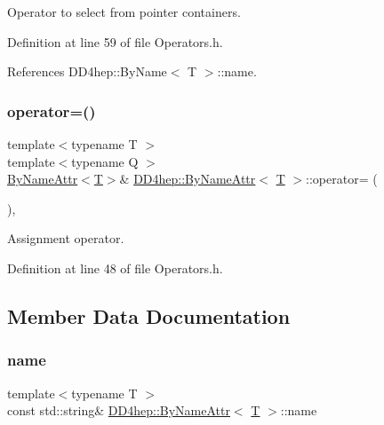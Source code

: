 Operator to select from pointer containers. 



Definition at line 59 of file Operators.\+h.



References D\+D4hep\+::\+By\+Name$<$ T $>$\+::name.

\hypertarget{class_d_d4hep_1_1_by_name_attr_ade17ea4f15656cd891831acb2dc83465}{}\label{class_d_d4hep_1_1_by_name_attr_ade17ea4f15656cd891831acb2dc83465} 
\subsubsection{\texorpdfstring{operator=()}{operator=()}}
{\footnotesize\ttfamily template$<$typename T $>$ \\
template$<$typename Q $>$ \\
\hyperlink{class_d_d4hep_1_1_by_name_attr}{By\+Name\+Attr}$<$\hyperlink{class_t}{T}$>$\& \hyperlink{class_d_d4hep_1_1_by_name_attr}{D\+D4hep\+::\+By\+Name\+Attr}$<$ \hyperlink{class_t}{T} $>$\+::operator= (\begin{DoxyParamCaption}\item[{const \hyperlink{class_d_d4hep_1_1_by_name_attr}{By\+Name\+Attr}$<$ Q $>$ \&}]{ }\end{DoxyParamCaption})\hspace{0.3cm}{\ttfamily [inline]}, {\ttfamily [private]}}



Assignment operator. 



Definition at line 48 of file Operators.\+h.



\subsection{Member Data Documentation}
\hypertarget{class_d_d4hep_1_1_by_name_attr_af7353d051e867c65d04fc7efb9975717}{}\label{class_d_d4hep_1_1_by_name_attr_af7353d051e867c65d04fc7efb9975717} 
\subsubsection{\texorpdfstring{name}{name}}
{\footnotesize\ttfamily template$<$typename T $>$ \\
const std\+::string\& \hyperlink{class_d_d4hep_1_1_by_name_attr}{D\+D4hep\+::\+By\+Name\+Attr}$<$ \hyperlink{class_t}{T} $>$\+::name}



